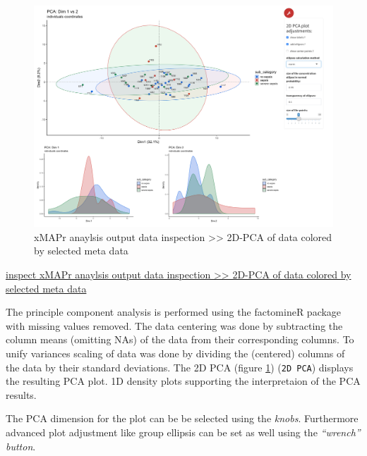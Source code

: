 \documentclass[
]{book}
\begin{document}
\begin{figure}

{\centering \includegraphics[width=42.36in]{figures/global_result_overview_PCA} 

}

\caption{xMAPr anaylsis output data inspection >> 2D-PCA of data colored by selected meta data}\label{fig:PCA2D}
\end{figure}

\href{figures/global_result_overview_PCA.png}{inspect xMAPr anaylsis output data inspection \textgreater\textgreater{} 2D-PCA of data colored by selected meta data}

The principle component analysis is performed using the factomineR package with missing values removed. The data centering was done by subtracting the column means (omitting NAs) of the data from their corresponding columns. To unify variances scaling of data was done by dividing the (centered) columns of the data by their standard deviations. The 2D PCA (figure \ref{fig:PCA2D}) (\texttt{2D\ PCA}) displays the resulting PCA plot. 1D density plots supporting the interpretaion of the PCA results.

The PCA dimension for the plot can be be selected using the \emph{knobs}. Furthermore advanced plot adjustment like group ellipsis can be set as well using the \emph{``wrench'' button}.
\end{document}
